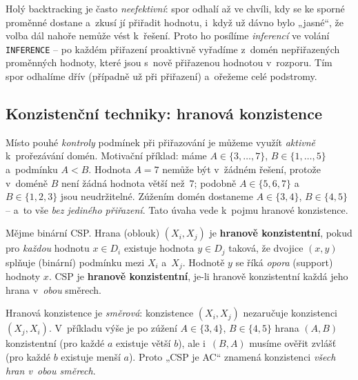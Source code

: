 \begin{intuice}
Holý backtracking je často \emph{neefektivní}: spor odhalí až ve chvíli, kdy se ke sporné proměnné dostane a~zkusí jí přiřadit hodnotu, i~když už dávno bylo „jasné``, že volba dál nahoře nemůže vést k~řešení. Proto ho posílíme \emph{inferencí} ve volání \texttt{INFERENCE} -- po každém přiřazení proaktivně vyřadíme z~domén nepřiřazených proměnných hodnoty, které jsou s~nově přiřazenou hodnotou v~rozporu. Tím spor odhalíme dřív (případně už při přiřazení) a~ořežeme celé podstromy.
\end{intuice}

\subsection{Konzistenční techniky: hranová konzistence}

Místo pouhé \emph{kontroly} podmínek při přiřazování je můžeme využít \emph{aktivně} k~prořezávání domén. Motivační příklad: máme $A\in\{3,\dots,7\}$, $B\in\{1,\dots,5\}$ a~podmínku $A<B$. Hodnota $A=7$ nemůže být v~žádném řešení, protože v~doméně $B$ není žádná hodnota větší než~$7$; podobně $A\in\{5,6,7\}$ a~$B\in\{1,2,3\}$ jsou neudržitelné. Zúžením domén dostaneme $A\in\{3,4\}$, $B\in\{4,5\}$ -- a~to vše \emph{bez jediného přiřazení}. Tato úvaha vede k~pojmu hranové konzistence.

\begin{definice}
Mějme binární CSP. Hrana (oblouk) $(X_i,X_j)$ je \textbf{hranově konzistentní}, pokud pro \emph{každou} hodnotu $x\in D_i$ existuje hodnota $y\in D_j$ taková, že dvojice $(x,y)$ splňuje (binární) podmínku mezi $X_i$ a~$X_j$. Hodnotě $y$ se říká \emph{opora} (support) hodnoty $x$. CSP je \textbf{hranově konzistentní}, je-li hranově konzistentní každá jeho hrana v~\emph{obou} směrech.
\end{definice}

\begin{poznamka}[Směrovost]
Hranová konzistence je \emph{směrová}: konzistence $(X_i,X_j)$ nezaručuje konzistenci $(X_j,X_i)$. V~příkladu výše je po zúžení $A\in\{3,4\}$, $B\in\{4,5\}$ hrana $(A,B)$ konzistentní (pro každé $a$ existuje větší $b$), ale i~$(B,A)$ musíme ověřit zvlášť (pro každé $b$ existuje menší $a$). Proto „CSP je AC`` znamená konzistenci \emph{všech hran v~obou směrech}.
\end{poznamka}


